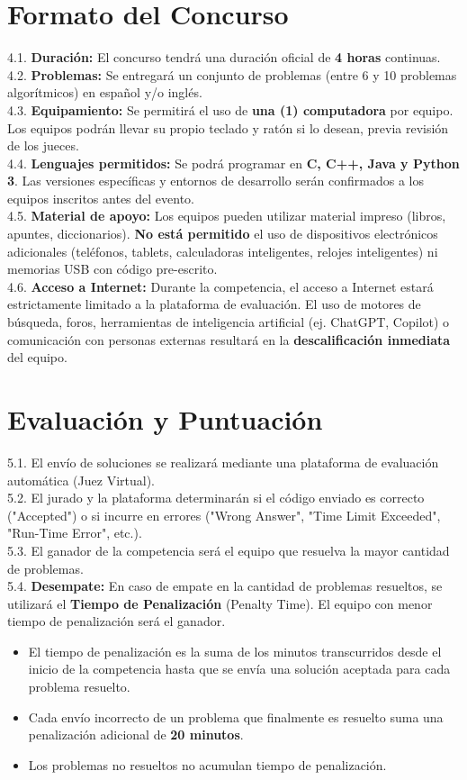 \documentclass[12pt,a4paper]{article}
\begin{document}
\section{Formato del Concurso}
4.1. \textbf{Duración:} El concurso tendrá una duración oficial de \textbf{4 horas} continuas. \\
4.2. \textbf{Problemas:} Se entregará un conjunto de problemas (entre 6 y 10 problemas algorítmicos) en español y/o inglés. \\
4.3. \textbf{Equipamiento:} Se permitirá el uso de \textbf{una (1) computadora} por equipo. Los equipos podrán llevar su propio teclado y ratón si lo desean, previa revisión de los jueces. \\
4.4. \textbf{Lenguajes permitidos:} Se podrá programar en \textbf{C, C++, Java y Python 3}. Las versiones específicas y entornos de desarrollo serán confirmados a los equipos inscritos antes del evento. \\
4.5. \textbf{Material de apoyo:} Los equipos pueden utilizar material impreso (libros, apuntes, diccionarios). \textbf{No está permitido} el uso de dispositivos electrónicos adicionales (teléfonos, tablets, calculadoras inteligentes, relojes inteligentes) ni memorias USB con código pre-escrito. \\
4.6. \textbf{Acceso a Internet:} Durante la competencia, el acceso a Internet estará estrictamente limitado a la plataforma de evaluación. El uso de motores de búsqueda, foros, herramientas de inteligencia artificial (ej. ChatGPT, Copilot) o comunicación con personas externas resultará en la \textbf{descalificación inmediata} del equipo.

\section{Evaluación y Puntuación}
5.1. El envío de soluciones se realizará mediante una plataforma de evaluación automática (Juez Virtual). \\
5.2. El jurado y la plataforma determinarán si el código enviado es correcto ("Accepted") o si incurre en errores ("Wrong Answer", "Time Limit Exceeded", "Run-Time Error", etc.). \\
5.3. El ganador de la competencia será el equipo que resuelva la mayor cantidad de problemas. \\
5.4. \textbf{Desempate:} En caso de empate en la cantidad de problemas resueltos, se utilizará el \textbf{Tiempo de Penalización} (Penalty Time). El equipo con menor tiempo de penalización será el ganador.
\begin{itemize}
    \item El tiempo de penalización es la suma de los minutos transcurridos desde el inicio de la competencia hasta que se envía una solución aceptada para cada problema resuelto.
    \item Cada envío incorrecto de un problema que finalmente es resuelto suma una penalización adicional de \textbf{20 minutos}.
    \item Los problemas no resueltos no acumulan tiempo de penalización.
\end{itemize}
\end{document}

